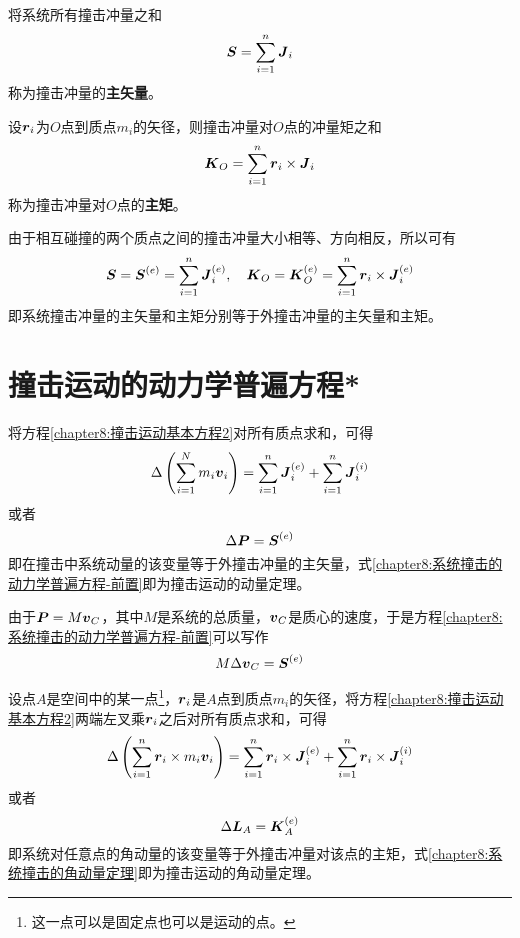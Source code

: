 将系统所有撞击冲量之和
\begin{equation}
	\boldsymbol{S} = \sum_{i=1}^n \boldsymbol{J}_i
\end{equation}
称为撞击冲量的{\bf 主矢量}。

设$\boldsymbol{r}_i$为$O$点到质点$m_i$的矢径，则撞击冲量对$O$点的冲量矩之和
\begin{equation}
	\boldsymbol{K}_O = \sum_{i=1}^n\boldsymbol{r}_i\times \boldsymbol{J}_i
\end{equation}
称为撞击冲量对$O$点的{\bf 主矩}。

由于相互碰撞的两个质点之间的撞击冲量大小相等、方向相反，所以可有
\begin{equation}
	\boldsymbol{S} = \boldsymbol{S}^{(e)} = \sum_{i=1}^n\boldsymbol{J}_i^{(e)},\quad \boldsymbol{K}_O = \boldsymbol{K}_O^{(e)} = \sum_{i=1}^n\boldsymbol{r}_i\times \boldsymbol{J}_i^{(e)}
\end{equation}
即系统撞击冲量的主矢量和主矩分别等于外撞击冲量的主矢量和主矩。

\section{撞击运动的动力学普遍方程*}

将方程\eqref{chapter8:撞击运动基本方程2}对所有质点求和，可得
\begin{equation*}
	\Delta \left(\sum_{i=1}^Nm_i\boldsymbol{v}_i\right) = \sum_{i=1}^n\boldsymbol{J}_i^{(e)}+\sum_{i=1}^n\boldsymbol{J}_i^{(i)}
\end{equation*}
或者
\begin{equation}
	\Delta \boldsymbol{P} = \boldsymbol{S}^{(e)}
	\label{chapter8:系统撞击的动力学普遍方程-前置}
\end{equation}
即在撞击中系统动量的该变量等于外撞击冲量的主矢量，式\eqref{chapter8:系统撞击的动力学普遍方程-前置}即为撞击运动的动量定理。

由于$\boldsymbol{P}=M\boldsymbol{v}_C$，其中$M$是系统的总质量，$\boldsymbol{v}_C$是质心的速度，于是方程\eqref{chapter8:系统撞击的动力学普遍方程-前置}可以写作
\begin{equation}
	M\Delta \boldsymbol{v}_C = \boldsymbol{S}^{(e)}
	\label{chapter8:系统撞击的动量定理}
\end{equation}

设点$A$是空间中的某一点\footnote{这一点可以是固定点也可以是运动的点。}，$\boldsymbol{r}_i$是$A$点到质点$m_i$的矢径，将方程\eqref{chapter8:撞击运动基本方程2}两端左叉乘$\boldsymbol{r}_i$之后对所有质点求和，可得
\begin{equation*}
	\Delta \left(\sum_{i=1}^n\boldsymbol{r}_i\times m_i\boldsymbol{v}_i\right) = \sum_{i=1}^n\boldsymbol{r}_i\times \boldsymbol{J}_i^{(e)}+\sum_{i=1}^n\boldsymbol{r}_i\times \boldsymbol{J}_i^{(i)}
\end{equation*}
或者
\begin{equation}
	\Delta\boldsymbol{L}_A = \boldsymbol{K}_A^{(e)}
	\label{chapter8:系统撞击的角动量定理}
\end{equation}
即系统对任意点的角动量的该变量等于外撞击冲量对该点的主矩，式\eqref{chapter8:系统撞击的角动量定理}即为撞击运动的角动量定理。

